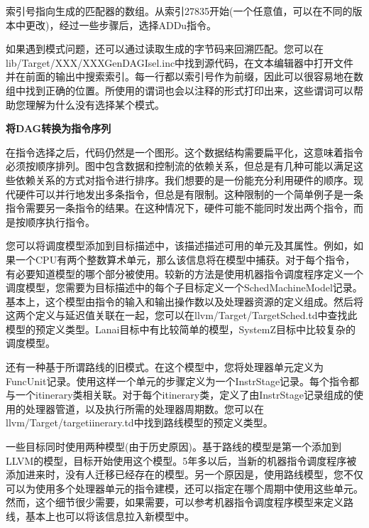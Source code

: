 索引号指向生成的匹配器的数组。从索引27835开始(一个任意值，可以在不同的版本中更改)，经过一些步骤后，选择ADDu指令。\par

\begin{tcolorbox}[colback=blue!5!white,colframe=blue!75!black, title=模式匹配]
如果遇到模式问题，还可以通过读取生成的字节码来回溯匹配。您可以在lib/Target/XXX/XXXGenDAGIsel.inc中找到源代码，在文本编辑器中打开文件并在前面的输出中搜索索引。每一行都以索引号作为前缀，因此可以很容易地在数组中找到正确的位置。所使用的谓词也会以注释的形式打印出来，这些谓词可以帮助您理解为什么没有选择某个模式。
\end{tcolorbox}

\hspace*{\fill} \par %
\textbf{将DAG转换为指令序列}

在指令选择之后，代码仍然是一个图形。这个数据结构需要扁平化，这意味着指令必须按顺序排列。图中包含数据和控制流的依赖关系，但总是有几种可能以满足这些依赖关系的方式对指令进行排序。我们想要的是一份能充分利用硬件的顺序。现代硬件可以并行地发出多条指令，但总是有限制。这种限制的一个简单例子是一条指令需要另一条指令的结果。在这种情况下，硬件可能不能同时发出两个指令，而是按顺序执行指令。\par

您可以将调度模型添加到目标描述中，该描述描述可用的单元及其属性。例如，如果一个CPU有两个整数算术单元，那么该信息将在模型中捕获。对于每个指令，有必要知道模型的哪个部分被使用。较新的方法是使用机器指令调度程序定义一个调度模型，您需要为目标描述中的每个子目标定义一个SchedMachineModel记录。基本上，这个模型由指令的输入和输出操作数以及处理器资源的定义组成。然后将这两个定义与延迟值关联在一起，您可以在llvm/Target/TargetSched.td中查找此模型的预定义类型。Lanai目标中有比较简单的模型，SystemZ目标中比较复杂的调度模型。\par

还有一种基于所谓路线的旧模式。在这个模型中，您将处理器单元定义为FuncUnit记录。使用这样一个单元的步骤定义为一个InstrStage记录。每个指令都与一个itinerary类相关联。对于每个itinerary类，定义了由InstrStage记录组成的使用的处理器管道，以及执行所需的处理器周期数。您可以在llvm/Target/targetiinerary.td中找到路线模型的预定义类型。\par

一些目标同时使用两种模型(由于历史原因)。基于路线的模型是第一个添加到LLVM的模型，目标开始使用这个模型。5年多以后，当新的机器指令调度程序被添加进来时，没有人迁移已经存在的模型。另一个原因是，使用路线模型，您不仅可以为使用多个处理器单元的指令建模，还可以指定在哪个周期中使用这些单元。然而，这个细节很少需要，如果需要，可以参考机器指令调度程序模型来定义路线，基本上也可以将该信息拉入新模型中。\par

